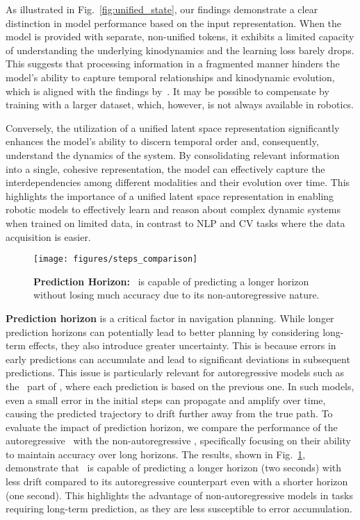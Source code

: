 As illustrated in Fig.~\ref{fig:unified_state}, our findings demonstrate a clear distinction in model performance based on the input representation. When the model is provided with separate, non-unified tokens, it exhibits a limited capacity of understanding the underlying kinodynamics and the learning loss barely drops. This suggests that processing information in a fragmented manner hinders the model's ability to capture temporal relationships and kinodynamic evolution, which is aligned with the findings by~\citet{zhou2024dinowm}. It may be possible to compensate by training with a larger dataset, which, however, is not always available in robotics.

Conversely, the utilization of a unified latent space representation significantly enhances the model's ability to discern temporal order and, consequently, understand the dynamics of the system. By consolidating relevant information into a single, cohesive representation, the model can effectively capture the interdependencies among different modalities and their evolution over time. This highlights the importance of a unified latent space representation in enabling robotic models to effectively learn and reason about complex dynamic systems when trained on limited data, in contrast to NLP and CV tasks where the data acquisition is easier.


\begin{figure}[h]
  \centering
  \texttt{[image: figures/steps\_comparison]}
  \caption{\textbf{Prediction Horizon:} \former~is capable of predicting a longer horizon without losing much accuracy due to its non-autoregressive nature.}
  \label{fig:pred_horizon}
\end{figure}
\textbf{Prediction horizon} is a critical factor in navigation planning. While longer prediction horizons can potentially lead to better planning by considering long-term effects, they also introduce greater uncertainty. This is because errors in early predictions can accumulate and lead to significant deviations in subsequent predictions. This issue is particularly relevant for autoregressive models such as the \vertidecoder~part of \former, where each prediction is based on the previous one. In such models, even a small error in the initial steps can propagate and amplify over time, causing the predicted trajectory to drift further away from the true path. To evaluate the impact of prediction horizon, we compare the performance of the autoregressive \vertidecoder~with the non-autoregressive \former, specifically focusing on their ability to maintain accuracy over long horizons. The results, shown in Fig.~\ref{fig:pred_horizon}, demonstrate that \former~is capable of predicting a longer horizon (two seconds) with less drift compared to its autoregressive counterpart even with a shorter horizon (one second). This highlights the advantage of non-autoregressive models in tasks requiring long-term prediction, as they are less susceptible to error accumulation.

